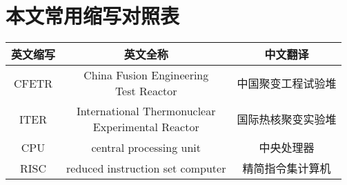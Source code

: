 \chapter{本文常用缩写对照表}

\begin{table}[h]
	\renewcommand\arraystretch{1.5}
	\centering
	\begin{tabular}{|c|c|c|}
		\hline
		英文缩写 & 英文全称 & 中文翻译 \\
		\hline
		CFETR & \tabincell{c}{ China Fusion Engineering \\ Test Reactor } & 中国聚变工程试验堆 \\
		\hline
		ITER & \tabincell{c}{ International Thermonuclear \\ Experimental Reactor } & 国际热核聚变实验堆 \\
		\hline
		CPU & central processing unit & 中央处理器 \\
		\hline
		RISC & reduced instruction set computer & 精简指令集计算机 \\
		\hline
	\end{tabular}
\end{table}
